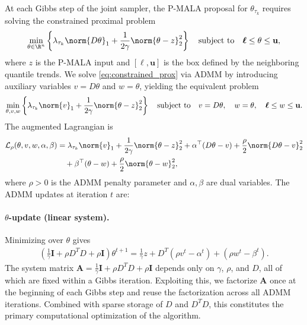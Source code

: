 At each Gibbs step of the joint sampler, the P-MALA proposal for $\theta_{\tau_k}$ requires solving the constrained proximal problem
\begin{equation}
    \min_{\theta \in \R^n}
    \left\{
    \lambda_{\tau_k} \norm{D\theta}_1
    + \frac{1}{2\gamma}\norm{\theta - z}_2^2
    \right\}
    \quad \text{subject to} \quad
    \boldsymbol{\ell} \leq \theta \leq \mathbf{u},
    \label{eq:constrained_prox}
\end{equation}
where $z$ is the P-MALA input and $[\boldsymbol{\ell}, \mathbf{u}]$ is the box defined by the neighboring quantile trends. We solve \eqref{eq:constrained_prox} via ADMM by introducing auxiliary variables $v = D\theta$ and $w = \theta$, yielding the equivalent problem
\begin{align*}
    \min_{\theta, v, w}
    \left\{
    \lambda_{\tau_k} \norm{v}_1
    + \frac{1}{2\gamma}\norm{\theta - z}_2^2
    \right\}
    \quad \text{subject to} \quad
    v = D\theta, \quad w = \theta, \quad
    \boldsymbol{\ell} \leq w \leq \mathbf{u}.
\end{align*}
The augmented Lagrangian is
\begin{align*}
    \mathcal{L}_\rho(\theta, v, w, {\alpha}, {\beta})
    &= \lambda_{\tau_k} \norm{v}_1
    + \frac{1}{2\gamma}\norm{\theta - z}_2^2
    + {\alpha}^\top(D\theta - v)
    + \frac{\rho}{2}\norm{D\theta - v}_2^2 \\
    &\quad + {\beta}^\top(\theta - w)
    + \frac{\rho}{2}\norm{\theta - w}_2^2,
\end{align*}
where $\rho > 0$ is the ADMM penalty parameter and ${\alpha}, {\beta}$ are dual variables. The ADMM updates at iteration $t$ are:

\paragraph{$\theta$-update (linear system).}
Minimizing over $\theta$ gives
\begin{align*}
    \left(\frac{1}{\gamma}\mathbf{I} + \rho D^{T}D
    + \rho\mathbf{I}\right)\theta^{t+1}
    = \frac{1}{\gamma}z
    + D^{T}(\rho v^t - {\alpha}^t)
    + (\rho w^t - {\beta}^t).
\end{align*}
The system matrix $\mathbf{A} = \frac{1}{\gamma}\mathbf{I} + \rho D^{T}D + \rho\mathbf{I}$ depends only on $\gamma$, $\rho$, and $D$, all of which are fixed within a Gibbs iteration. Exploiting this, we factorize $\mathbf{A}$ once at the beginning of each Gibbs step and reuse the factorization across all ADMM iterations. Combined with sparse storage of $D$ and $D^{T}D$, this constitutes the primary computational optimization of the algorithm.

